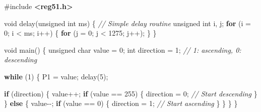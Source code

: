 \documentclass[
]{article}
\newenvironment{Shaded}{}{}
\newcommand{\CommentTok}[1]{\textcolor[rgb]{0.38,0.63,0.69}{\textit{#1}}}
\newcommand{\ControlFlowTok}[1]{\textcolor[rgb]{0.00,0.44,0.13}{\textbf{#1}}}
\newcommand{\DataTypeTok}[1]{\textcolor[rgb]{0.56,0.13,0.00}{#1}}
\newcommand{\DecValTok}[1]{\textcolor[rgb]{0.25,0.63,0.44}{#1}}
\newcommand{\ImportTok}[1]{\textcolor[rgb]{0.00,0.50,0.00}{\textbf{#1}}}
\newcommand{\NormalTok}[1]{#1}
\newcommand{\OperatorTok}[1]{\textcolor[rgb]{0.40,0.40,0.40}{#1}}
\newcommand{\PreprocessorTok}[1]{\textcolor[rgb]{0.74,0.48,0.00}{#1}}
\begin{document}
\begin{Shaded}
\begin{Highlighting}[]
\PreprocessorTok{\#include }\ImportTok{\textless{}reg51.h\textgreater{}}

\DataTypeTok{void}\NormalTok{ delay}\OperatorTok{(}\DataTypeTok{unsigned} \DataTypeTok{int}\NormalTok{ ms}\OperatorTok{)} \OperatorTok{\{} \CommentTok{// Simple delay routine}
    \DataTypeTok{unsigned} \DataTypeTok{int}\NormalTok{ i}\OperatorTok{,}\NormalTok{ j}\OperatorTok{;}
    \ControlFlowTok{for} \OperatorTok{(}\NormalTok{i }\OperatorTok{=} \DecValTok{0}\OperatorTok{;}\NormalTok{ i }\OperatorTok{\textless{}}\NormalTok{ ms}\OperatorTok{;}\NormalTok{ i}\OperatorTok{++)} \OperatorTok{\{}
        \ControlFlowTok{for} \OperatorTok{(}\NormalTok{j }\OperatorTok{=} \DecValTok{0}\OperatorTok{;}\NormalTok{ j }\OperatorTok{\textless{}} \DecValTok{1275}\OperatorTok{;}\NormalTok{ j}\OperatorTok{++);}
    \OperatorTok{\}}
\OperatorTok{\}}

\DataTypeTok{void}\NormalTok{ main}\OperatorTok{()} \OperatorTok{\{}
    \DataTypeTok{unsigned} \DataTypeTok{char}\NormalTok{ value }\OperatorTok{=} \DecValTok{0}\OperatorTok{;}
    \DataTypeTok{int}\NormalTok{ direction }\OperatorTok{=} \DecValTok{1}\OperatorTok{;}  \CommentTok{// 1: ascending, 0: descending}

    \ControlFlowTok{while} \OperatorTok{(}\DecValTok{1}\OperatorTok{)} \OperatorTok{\{}
\NormalTok{       P1 }\OperatorTok{=}\NormalTok{ value}\OperatorTok{;}
\NormalTok{       delay}\OperatorTok{(}\DecValTok{5}\OperatorTok{);}

       \ControlFlowTok{if} \OperatorTok{(}\NormalTok{direction}\OperatorTok{)} \OperatorTok{\{}
\NormalTok{           value}\OperatorTok{++;}
           \ControlFlowTok{if} \OperatorTok{(}\NormalTok{value }\OperatorTok{==} \DecValTok{255}\OperatorTok{)} \OperatorTok{\{}
\NormalTok{               direction }\OperatorTok{=} \DecValTok{0}\OperatorTok{;} \CommentTok{// Start descending}
           \OperatorTok{\}}
       \OperatorTok{\}} \ControlFlowTok{else} \OperatorTok{\{}
\NormalTok{           value}\OperatorTok{{-}{-};}
           \ControlFlowTok{if} \OperatorTok{(}\NormalTok{value }\OperatorTok{==} \DecValTok{0}\OperatorTok{)} \OperatorTok{\{}
\NormalTok{               direction }\OperatorTok{=} \DecValTok{1}\OperatorTok{;} \CommentTok{// Start ascending}
           \OperatorTok{\}}
       \OperatorTok{\}}
    \OperatorTok{\}}
\OperatorTok{\}}
\end{Highlighting}
\end{Shaded}
\end{document}
